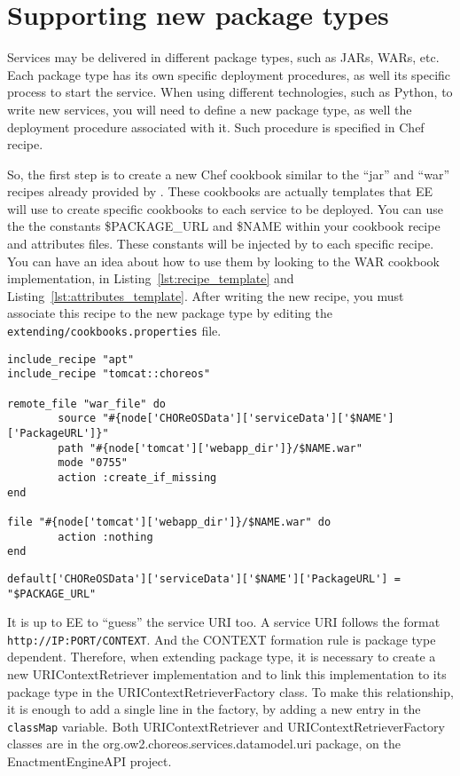 \section{Supporting new package types}

Services may be delivered in different package types, such as JARs, WARs, etc.
Each package type has its own specific deployment procedures, as well its specific process to start the service.
When using different technologies, such as Python, to write new services, you will need to define a new package type,
as well the deployment procedure associated with it. Such procedure is specified in Chef recipe. 

So, the first step is to create a new Chef cookbook similar to the ``jar'' and ``war'' recipes already provided by \ee.
These cookbooks are actually templates that EE will use to create specific cookbooks to each service to be deployed.
You can use the the constants \$PACKAGE\_URL and \$NAME within your cookbook recipe and attributes files. These constants will be injected by \ee to each specific recipe.
You can have an idea about how to use them by looking to the WAR cookbook implementation, in Listing~\ref{lst:recipe_template} and Listing~\ref{lst:attributes_template}.
After writing the new recipe, you must associate this recipe to the new package type by editing the \texttt{extending/cookbooks.properties} file.

\begin{lstlisting}[frame=trbl, label=lst:recipe_template, caption=Recipe template for WAR deployment.]
include_recipe "apt" 
include_recipe "tomcat::choreos"

remote_file "war_file" do
        source "#{node['CHOReOSData']['serviceData']['$NAME']['PackageURL']}"
        path "#{node['tomcat']['webapp_dir']}/$NAME.war"
        mode "0755"
        action :create_if_missing
end

file "#{node['tomcat']['webapp_dir']}/$NAME.war" do
        action :nothing
end
\end{lstlisting}

\begin{lstlisting}[frame=trbl, label=lst:attributes_template, caption=Attributes template for WAR deployment.]
default['CHOReOSData']['serviceData']['$NAME']['PackageURL'] = "$PACKAGE_URL"
\end{lstlisting}

It is up to EE to ``guess'' the service URI too.
A service URI follows the format \texttt{http://IP:PORT/CONTEXT}.
And the CONTEXT formation rule is package type dependent.
Therefore, when extending package type, it is necessary to create a new \textsf{URIContextRetriever}
implementation and to link this implementation to its package type in the \textsf{URIContextRetrieverFactory} class. To make this relationship, it is enough to add
a single line in the factory, by adding a new entry in the \texttt{classMap} variable.
Both \textsf{URIContextRetriever} and \textsf{URIContextRetrieverFactory} classes are in the \textsf{org.ow2.choreos.services.datamodel.uri} package, on the EnactmentEngineAPI project.

